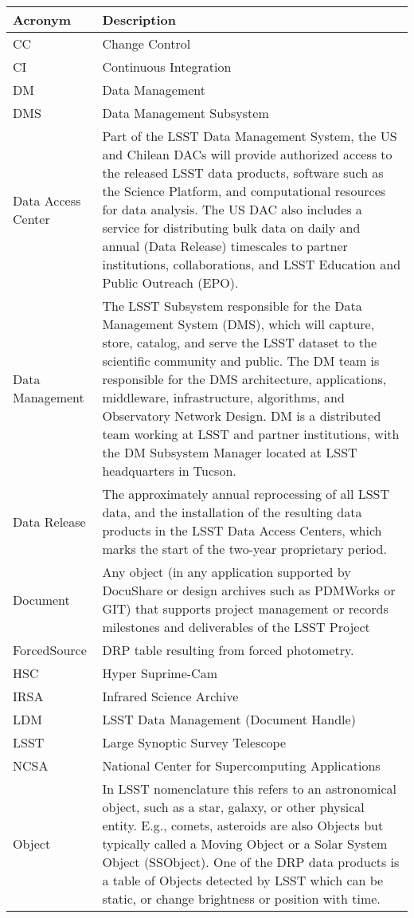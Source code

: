 \addtocounter{table}{-1}
\begin{longtable}{|l|p{}|}\hline
\textbf{Acronym} & \textbf{Description}  \\\hline

CC & Change Control \\\hline
CI & Continuous Integration \\\hline
DM & Data Management \\\hline
DMS & Data Management Subsystem \\\hline
Data Access Center & Part of the LSST Data Management System, the US and Chilean DACs will provide authorized access to the released LSST data products, software such as the Science Platform, and computational resources for data analysis. The US DAC also includes a service for distributing bulk data on daily and annual (Data Release) timescales to partner institutions, collaborations, and LSST Education and Public Outreach (EPO).  \\\hline
Data Management & The LSST Subsystem responsible for the Data Management System (DMS), which will capture, store, catalog, and serve the LSST dataset to the scientific community and public. The DM team is responsible for the DMS architecture, applications, middleware, infrastructure, algorithms, and Observatory Network Design. DM is a distributed team working at LSST and partner institutions, with the DM Subsystem Manager located at LSST headquarters in Tucson. \\\hline
Data Release & The approximately annual reprocessing of all LSST data, and the installation of the resulting data products in the LSST Data Access Centers, which marks the start of the two-year proprietary period. \\\hline
Document & Any object (in any application supported by DocuShare or design archives such as PDMWorks or GIT) that supports project management or records milestones and deliverables of the LSST Project \\\hline
ForcedSource & DRP table resulting from forced photometry. \\\hline
HSC & Hyper Suprime-Cam \\\hline
IRSA & Infrared Science Archive \\\hline
LDM & LSST Data Management (Document Handle) \\\hline
LSST & Large Synoptic Survey Telescope \\\hline
NCSA & National Center for Supercomputing Applications \\\hline
Object & In LSST nomenclature this refers to an astronomical object, such as a star, galaxy, or other physical entity. E.g., comets, asteroids are also Objects but typically called a Moving Object or a Solar System Object (SSObject). One of the DRP data products is a table of Objects detected by LSST which can be static, or change brightness or position with time. \\\hline

\end{longtable}
